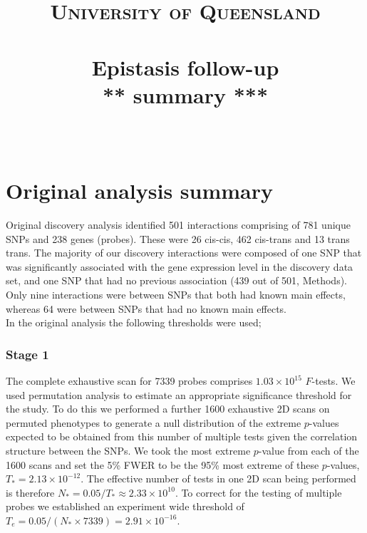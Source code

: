 \documentclass[paper=a4, fontsize=11pt]{scrartcl}         %
\title{
    \usefont{OT1}{bch}{b}{n}
    \normalfont \normalsize \textsc{University of Queensland} \\ [25pt]
    \horrule{0.5pt} \\[0.4cm]
    \huge Epistasis follow-up \\[0.3cm]
        \huge *** summary *** \\
    \horrule{2pt} \\[0.5cm]
    \date{}
}
\numberwithin{equation}{section}                  %
\numberwithin{figure}{section}                    %
\numberwithin{table}{section}                   %
\begin{document}


\maketitle



\newpage
\section*{Original analysis summary}
\noindent


Original discovery analysis identified 501 interactions comprising of 781 unique SNPs and 238 genes (probes). These were 26 cis-cis, 462 cis-trans and 13 trans trans. The majority of our discovery interactions were composed of one SNP that was significantly associated with the gene expression level in the discovery data set, and one SNP that had no previous association (439 out of 501, Methods). Only nine interactions were between SNPs that both had known main effects, whereas 64 were between SNPs that had no known main effects. \\

In the original analysis the following thresholds were used; \\

\subsubsection*{Stage 1}
 
The complete exhaustive scan for 7339 probes comprises $1.03 \times 10^{15}$ $F$-tests. We used permutation analysis to estimate an appropriate significance threshold for the study. To do this we performed a further 1600 exhaustive 2D scans on permuted phenotypes to generate a null distribution of the extreme $p$-values expected to be obtained from this number of multiple tests given the correlation structure between the SNPs. We took the most extreme $p$-value from each of the 1600 scans and set the 5\% FWER to be the 95\% most extreme of these $p$-values, $T_{*} = 2.13 \times 10^{-12}$. The effective number of tests in one 2D scan being performed is therefore $N_{*} = 0.05 / T_{*} \approx 2.33 \times 10^{10}$. To correct for the testing of multiple probes we established an experiment wide threshold of $T_{e} = 0.05 / (N_{*} \times 7339) = 2.91 \times 10^{-16}$. 
\end{document}
